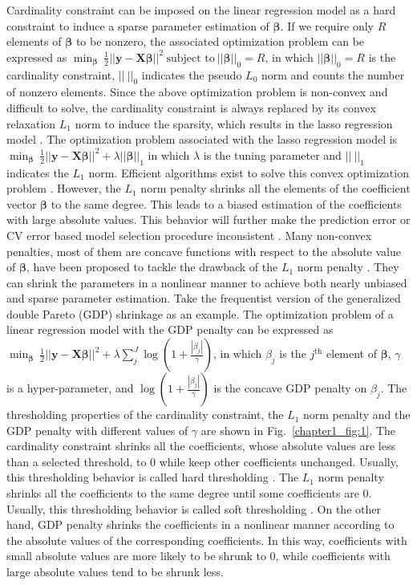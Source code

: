 Cardinality constraint can be imposed on the linear regression model as a hard constraint to induce a sparse parameter estimation of $\bm{\beta}$. If we require only $R$ elements of $\bm{\beta}$ to be nonzero, the associated optimization problem can be expressed as $\min_{\bm{\beta}} ~ \frac{1}{2}||\mathbf{y} - \mathbf{X}\bm{\beta}||^2 ~ \text{subject to} ~ ||\bm{\beta}||_0 = R$, in which $||\bm{\beta}||_0 = R$ is the cardinality constraint, $||~||_0$ indicates the pseudo $L_{0}$ norm and counts the number of nonzero elements. Since the above optimization problem is non-convex and difficult to solve, the cardinality constraint is always replaced by its convex relaxation $L_1$ norm to induce the sparsity, which results in the lasso regression model \cite{tibshirani1996regression}. The optimization problem associated with the lasso regression model is $\min_{\bm{\beta}} ~ \frac{1}{2}||\mathbf{y} - \mathbf{X}\bm{\beta}||^2 + \lambda ||\bm{\beta}||_1$ in which $\lambda$ is the tuning parameter and $||~||_1$ indicates the $L_{1}$ norm. Efficient algorithms exist to solve this convex optimization problem \cite{efron2004least,parikh2014proximal}. However, the $L_{1}$ norm penalty shrinks all the elements of the coefficient vector $\bm{\beta}$ to the same degree. This leads to a biased estimation of the coefficients with large absolute values. This behavior will further make the prediction error or CV error based model selection procedure inconsistent \cite{meinshausen2010stability}. Many non-convex penalties, most of them are concave functions with respect to the absolute value of $\bm{\beta}$, have been proposed to tackle the drawback of the $L_{1}$ norm penalty \cite{fan2001variable,armagan2013generalized}. They can shrink the parameters in a nonlinear manner to achieve both nearly unbiased and sparse parameter estimation. Take the frequentist version of the generalized double Pareto (GDP) \cite{armagan2013generalized} shrinkage as an example. The optimization problem of a linear regression model with the GDP penalty can be expressed as $\min_{\bm{\beta}} ~ \frac{1}{2}||\mathbf{y} - \mathbf{X}\bm{\beta}||^2 + \lambda \sum_{j}^{J} \log(1+\frac{|\beta_j|}{\gamma})$, in which $\beta_j$ is the $j^{\text{th}}$ element of $\bm{\beta}$, $\gamma$ is a hyper-parameter, and $\log(1+\frac{|\beta_j|}{\gamma})$ is the concave GDP penalty on $\beta_j$. The thresholding properties of the cardinality constraint, the $L_{1}$ norm penalty and the GDP penalty with different values of $\gamma$ are shown in Fig.~\ref{chapter1_fig:1}. The cardinality constraint shrinks all the coefficients, whose absolute values are less than a selected threshold, to 0 while keep other coefficients unchanged. Usually, this thresholding behavior is called hard thresholding \cite{tibshirani1996regression}. The $L_{1}$ norm penalty shrinks all the coefficients to the same degree until some coefficients are 0. Usually, this thresholding behavior is called soft thresholding \cite{tibshirani1996regression}. On the other hand, GDP penalty shrinks the coefficients in a nonlinear manner according to the absolute values of the corresponding coefficients. In this way, coefficients with small absolute values are more likely to be shrunk to 0, while coefficients with large absolute values tend to be shrunk less.
